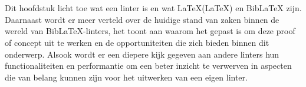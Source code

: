 \chapter{}%
\label{ch:stand-van-zaken}






Dit hoofdstuk licht toe wat een linter is en wat \LaTeX(\LaTeX) en BibLaTeX zijn. Daarnaast wordt er meer verteld over de huidige stand van zaken binnen de wereld van BibLaTeX-linters, het toont aan waarom het gepast is om deze proof of concept uit te werken en de opportuniteiten die zich bieden binnen dit onderwerp. Alsook wordt er een diepere kijk gegeven aan andere linters hun functionaliteiten en performantie om een beter inzicht te verwerven in aspecten die van belang kunnen zijn voor het uitwerken van een eigen linter.

